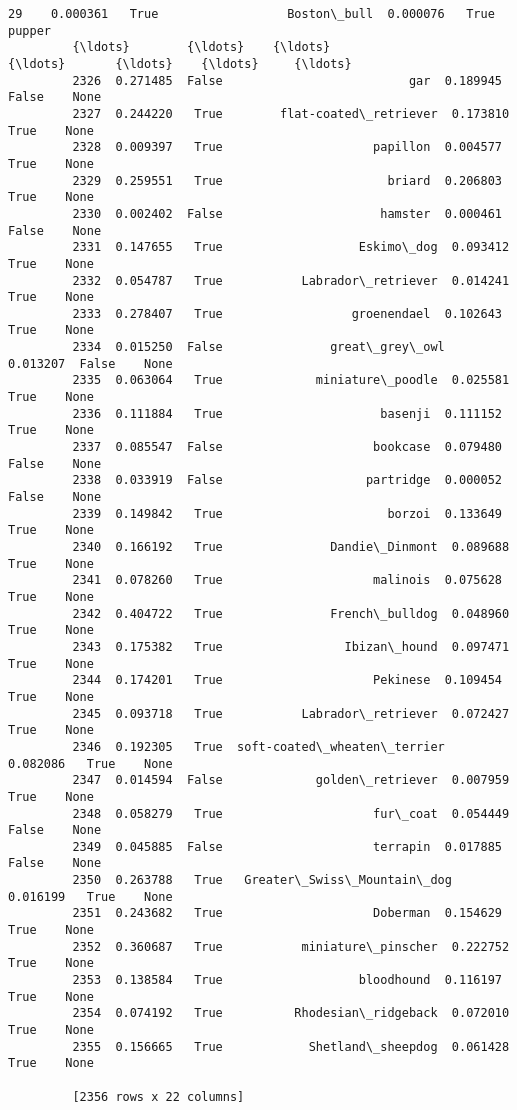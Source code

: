 \documentclass[11pt]{article}
\begin{document}
\begin{Verbatim}[commandchars=\\\{\}]
         29    0.000361   True                  Boston\_bull  0.000076   True  pupper  
         {\ldots}        {\ldots}    {\ldots}                          {\ldots}       {\ldots}    {\ldots}     {\ldots}  
         2326  0.271485  False                          gar  0.189945  False    None  
         2327  0.244220   True        flat-coated\_retriever  0.173810   True    None  
         2328  0.009397   True                     papillon  0.004577   True    None  
         2329  0.259551   True                       briard  0.206803   True    None  
         2330  0.002402  False                      hamster  0.000461  False    None  
         2331  0.147655   True                   Eskimo\_dog  0.093412   True    None  
         2332  0.054787   True           Labrador\_retriever  0.014241   True    None  
         2333  0.278407   True                  groenendael  0.102643   True    None  
         2334  0.015250  False               great\_grey\_owl  0.013207  False    None  
         2335  0.063064   True             miniature\_poodle  0.025581   True    None  
         2336  0.111884   True                      basenji  0.111152   True    None  
         2337  0.085547  False                     bookcase  0.079480  False    None  
         2338  0.033919  False                    partridge  0.000052  False    None  
         2339  0.149842   True                       borzoi  0.133649   True    None  
         2340  0.166192   True               Dandie\_Dinmont  0.089688   True    None  
         2341  0.078260   True                     malinois  0.075628   True    None  
         2342  0.404722   True               French\_bulldog  0.048960   True    None  
         2343  0.175382   True                 Ibizan\_hound  0.097471   True    None  
         2344  0.174201   True                     Pekinese  0.109454   True    None  
         2345  0.093718   True           Labrador\_retriever  0.072427   True    None  
         2346  0.192305   True  soft-coated\_wheaten\_terrier  0.082086   True    None  
         2347  0.014594  False             golden\_retriever  0.007959   True    None  
         2348  0.058279   True                     fur\_coat  0.054449  False    None  
         2349  0.045885  False                     terrapin  0.017885  False    None  
         2350  0.263788   True   Greater\_Swiss\_Mountain\_dog  0.016199   True    None  
         2351  0.243682   True                     Doberman  0.154629   True    None  
         2352  0.360687   True           miniature\_pinscher  0.222752   True    None  
         2353  0.138584   True                   bloodhound  0.116197   True    None  
         2354  0.074192   True          Rhodesian\_ridgeback  0.072010   True    None  
         2355  0.156665   True            Shetland\_sheepdog  0.061428   True    None  
         
         [2356 rows x 22 columns]
\end{Verbatim}
            
\end{document}
